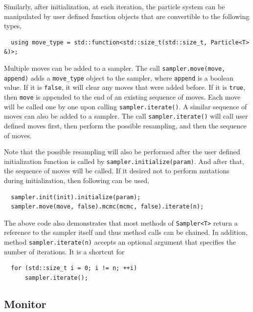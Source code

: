 Similarly, after initialization, at each iteration, the particle system can be
manipulated by user defined function objects that are convertible to the
following types,
\begin{Verbatim}
  using move_type = std::function<std::size_t(std::size_t, Particle<T> &)>;
\end{Verbatim}
Multiple moves can be added to a sampler. The call
\verb|sampler.move(move, append)| adds a \verb|move_type| object to the
sampler, where \verb|append| is a boolean value. If it is \verb|false|, it will
clear any moves that were added before. If it is \verb|true|, then \verb|move|
is appended to the end of an existing sequence of moves. Each move will be
called one by one upon calling \verb|sampler.iterate()|. A similar sequence of
\mcmc moves can also be added to a sampler. The call \verb|sampler.iterate()|
will call user defined moves first, then perform the possible resampling, and
then the sequence of \mcmc moves.

Note that the possible resampling will also be performed after the user defined
initialization function is called by \verb|sampler.initialize(param)|. And
after that, the sequence of \mcmc moves will be called. If it desired not to
perform mutations during initialization, then following can be used,
\begin{Verbatim}
  sampler.init(init).initialize(param);
  sampler.move(move, false).mcmc(mcmc, false).iterate(n);
\end{Verbatim}
The above code also demonstrates that most methods of \verb|Sampler<T>| return
a reference to the sampler itself and thus method calls can be chained. In
addition, method \verb|sampler.iterate(n)| accepts an optional argument that
specifies the number of iterations. It is a shortcut for
\begin{Verbatim}
  for (std::size_t i = 0; i != n; ++i)
      sampler.iterate();
\end{Verbatim}

\subsection{Monitor}
\label{sub:Monitor}


